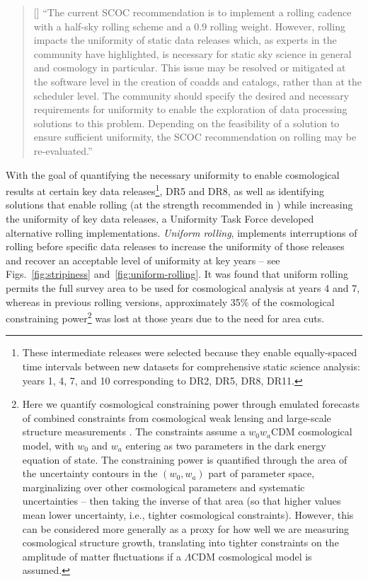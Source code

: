  \begin{quote}
     [] ``The current SCOC recommendation is to implement a rolling cadence with a half-sky rolling scheme and a 0.9 rolling weight. However, rolling impacts the uniformity of static data releases which, as experts in the community have highlighted, is necessary for static sky science in general and cosmology in particular. This issue may be resolved or mitigated at the software level in the creation of coadds and catalogs, rather than at the scheduler level. The community should specify the desired and necessary requirements for uniformity to enable the exploration of data processing solutions to this problem. Depending on the feasibility of a solution to ensure sufficient uniformity, the SCOC recommendation on rolling may be re-evaluated.'' 

 \end{quote}

 With the goal of quantifying the necessary uniformity to enable cosmological results at certain key data releases\footnote{These intermediate releases were selected because they enable equally-spaced time intervals between new datasets for comprehensive static science analysis: years 1, 4, 7, and 10 corresponding to DR2, DR5, DR8, DR11.}, DR5 and DR8, as well as identifying solutions that enable rolling (at the strength recommended in ) while increasing the uniformity of key data releases, a Uniformity Task Force developed alternative rolling implementations. {\it Uniform rolling}, implements interruptions of rolling before specific data releases to increase the uniformity of those releases and recover an acceptable level of uniformity at key years -- see Figs.~\ref{fig:stripiness} and~\ref{fig:uniform-rolling}.  It was found that uniform rolling permits the full survey area to be used for cosmological analysis at years 4 and 7, whereas in previous rolling versions, approximately 35\% of the cosmological constraining power\footnote{Here we quantify cosmological constraining power through emulated forecasts of combined constraints from cosmological weak lensing and large-scale structure measurements \citep{2022ApJS..259...58L}.  The constraints assume a $w_0 w_a$CDM cosmological model, with $w_0$ and $w_a$ entering as two parameters in the dark energy equation of state.  The constraining power is quantified through the area of the uncertainty contours in the $(w_0, w_a)$ part of parameter space, marginalizing over other cosmological parameters and systematic uncertainties -- then taking the inverse of that area (so that higher values mean lower uncertainty, i.e., tighter cosmological constraints).  However, this can be considered more generally as a proxy for how well we are measuring cosmological structure growth, translating into tighter constraints on the amplitude of matter fluctuations if a $\Lambda$CDM cosmological model is assumed.} was lost at those years due to the need for area cuts. 

